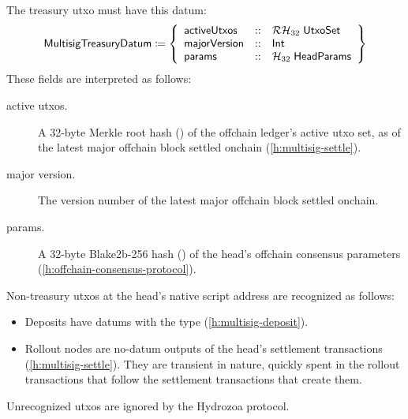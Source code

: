 \documentclass[../hydrozoa.tex]{subfiles}
\begin{document}
The treasury utxo must have this datum:
\begin{equation*}
  \mathsf{MultisigTreasuryDatum} \coloneq \left\{
    \begin{array}{lll}
      \mathsf{activeUtxos}  &::& \mathcal{RH}_{32} \; \mathsf{UtxoSet} \\
      \mathsf{majorVersion} &::& \mathsf{Int} \\
      \mathsf{params} &::& \mathcal{H}_{32} \; \mathsf{HeadParams}
    \end{array}\right\}
\end{equation*}
These fields are interpreted as follows:
\begin{description}
  \item[active utxos.] A 32-byte Merkle root hash () of the offchain ledger's active utxo set, as of the latest major offchain block settled onchain (\cref{h:multisig-settle}).
  \item[major version.] The version number of the latest major offchain block settled onchain.
  \item[params.] A 32-byte Blake2b-256 hash () of the head's offchain consensus parameters (\cref{h:offchain-consensus-protocol}).
\end{description}

Non-treasury utxos at the head's native script address are recognized as follows:
\begin{itemize}
  \item Deposits have datums with the  type (\cref{h:multisig-deposit}).
  \item Rollout nodes are no-datum outputs of the head's settlement transactions (\cref{h:multisig-settle}).
    They are transient in nature, quickly spent in the rollout transactions that follow the settlement transactions that create them.
\end{itemize}

Unrecognized utxos are ignored by the Hydrozoa protocol.
\end{document}
